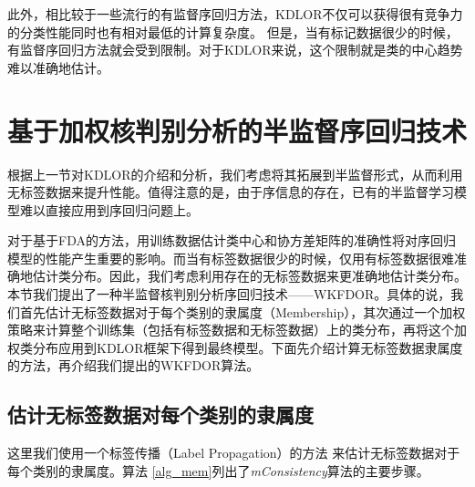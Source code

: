 此外，相比较于一些流行的有监督序回归方法，KDLOR不仅可以获得很有竞争力的分类性能同时也有相对最低的计算复杂度\citep{sun2010kernel}。
但是，当有标记数据很少的时候，有监督序回归方法就会受到限制。对于KDLOR来说，这个限制就是类的中心趋势难以准确地估计。

\section{基于加权核判别分析的半监督序回归技术}

根据上一节对KDLOR的介绍和分析，我们考虑将其拓展到半监督形式，从而利用无标签数据来提升性能。值得注意的是，由于序信息的存在，已有的半监督学习模型难以直接应用到序回归问题上。

对于基于FDA的方法，用训练数据估计类中心和协方差矩阵的准确性将对序回归模型的性能产生重要的影响。而当有标签数据很少的时候，仅用有标签数据很难准确地估计类分布。因此，我们考虑利用存在的无标签数据来更准确地估计类分布。本节我们提出了一种半监督核判别分析序回归技术——WKFDOR。具体的说，我们首先估计无标签数据对于每个类别的隶属度（Membership），其次通过一个加权策略来计算整个训练集（包括有标签数据和无标签数据）上的类分布，再将这个加权类分布应用到KDLOR框架下得到最终模型。下面先介绍计算无标签数据隶属度的方法，再介绍我们提出的WKFDOR算法。

\subsection{估计无标签数据对每个类别的隶属度}
这里我们使用一个标签传播（Label Propagation）的方法\citep{zhou2004learning}
来估计无标签数据对于每个类别的隶属度。算法 \ref{alg_mem}列出了\textit{mConsistency}算法的主要步骤。

